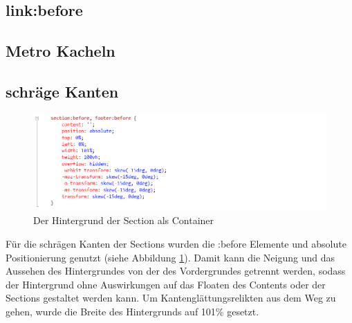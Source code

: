 \subsection{link:before}

\subsection{Metro Kacheln}

\subsection{schräge Kanten}
\begin{figure} [h]
\includegraphics[width=\textwidth]{./img/css_secbefore.png}
\caption{Der Hintergrund der Section als Container}
\label{css_secbefore}
\end{figure}
Für die schrägen Kanten der Sections wurden die :before Elemente und absolute Positionierung genutzt (siehe Abbildung \ref{css_secbefore}). Damit kann die Neigung und das Aussehen des Hintergrundes von der des Vordergrundes getrennt werden, sodass der Hintergrund ohne Auswirkungen auf das Floaten des Contents oder der Sections gestaltet werden kann. Um Kantenglättungsrelikten aus dem Weg zu gehen, wurde die Breite des Hintergrunds auf 101\% gesetzt.

